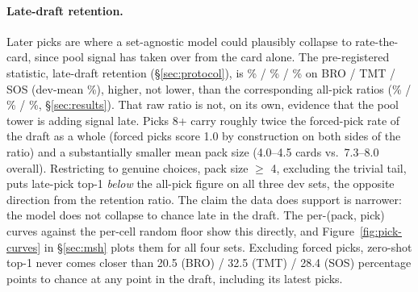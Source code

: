 \paragraph{Late-draft retention.}
Later picks are where a set-agnostic model could plausibly collapse to
rate-the-card, since pool signal has taken over from the card alone. The
pre-registered statistic, late-draft retention (\S\ref{sec:protocol}), is
\LateRetBro\% / \LateRetTmt\% / \LateRetSos\% on BRO / TMT / SOS (dev-mean
\LateRetDevMean\%), higher, not lower, than the corresponding all-pick
ratios (\RatioBro\% / \RatioTmt\% / \RatioSos\%, \S\ref{sec:results}). That
raw ratio is not, on its own, evidence that the pool tower is adding
signal late. Picks 8+ carry roughly twice the forced-pick rate of the
draft as a whole (forced picks score 1.0 by construction on both sides of
the ratio) and a substantially smaller mean pack size (4.0--4.5 cards
vs.\ 7.3--8.0 overall). Restricting to genuine choices, pack size $\geq$
4, excluding the trivial tail, puts late-pick top-1 \emph{below} the
all-pick figure on all three dev sets, the opposite direction from the
retention ratio. The claim the data does support is narrower: the model
does not collapse to chance late in the draft. The per-(pack, pick) curves
against the per-cell random floor show this directly, and
Figure~\ref{fig:pick-curves} in \S\ref{sec:msh} plots them for all four
sets. Excluding forced picks, zero-shot top-1 never comes closer than
20.5 (BRO) / 32.5 (TMT) / 28.4 (SOS) percentage points to chance at any
point in the draft, including its latest picks.
